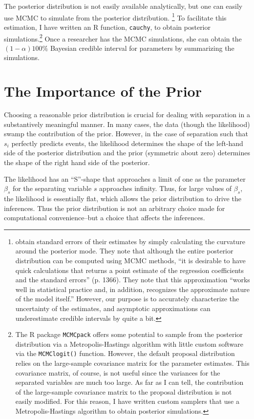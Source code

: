 \documentclass[12pt]{article}
\begin{document}
The posterior distribution is not easily available analytically, but one can easily use MCMC to simulate from the posterior distribution. \footnote{\citep{Gelmanetal2008} obtain standard errors of their estimates by simply calculating the curvature around the posterior mode. They note that although the entire posterior distribution can be computed using MCMC methods, ``it is desirable to have quick calculations that returns a point estimate of the regression coefficients and the standard errors'' (p. 1366). They note that this approximation ``works well in statistical practice and, in addition, recognizes the approximate nature of the model itself.'' However, our purpose is to accurately characterize the uncertainty of the estimates, and asymptotic approximations can underestimate credible intervals by quite a bit.} To facilitate this estimation, I have written an R function, \texttt{cauchy}, to obtain posterior simulations.\footnote{The R package \texttt{MCMCpack} offers some potential to sample from the posterior distribution via a Metropolis-Hastings algorithm with little custom software via the \texttt{MCMClogit()} function. However, the default proposal distribution relies on the large-sample covariance matrix for the parameter estimates. This covariance matrix, of course, is not useful since the variances for the separated variables are much too large. As far as I can tell, the contribution of the large-sample covariance matrix to the proposal distribution is not easily modified. For this reason, I have written custom samplers that use a Metropolis-Hastings algorithm to obtain posterior simulations.} Once a researcher has the MCMC simulations, she can obtain the $(1 - \alpha)100\%$ Bayesian credible interval for parameters by summarizing the simulations.

\section*{The Importance of the Prior}

Choosing a reasonable prior distribution is crucial for dealing with separation in a substantively meaningful manner. In many cases, the data (though the likelihood) swamp the contribution of the prior. However, in the case of separation such that $s_i$ perfectly predicts events, the likelihood determines the shape of the left-hand side of the posterior distribution and the prior (symmetric about zero) determines the shape of the right hand side of the posterior.

The likelihood has an ``S''-shape that approaches a limit of one as the parameter $\beta_s$ for the separating variable $s$ approaches infinity. Thus, for large values of $\beta_s$, the likelihood is essentially flat, which allows the prior distribution to drive the inferences. Thus the prior distribution is not an arbitrary choice made for computational convenience--but a choice that affects the inferences.
\end{document}
